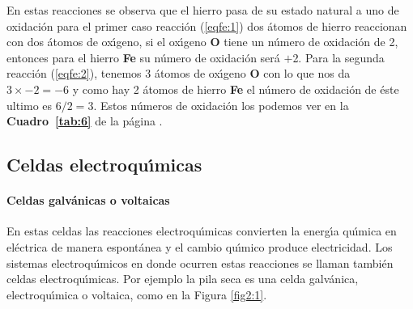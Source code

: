 En estas reacciones se observa que el hierro pasa de su estado natural a uno de oxidaci\'on para el primer caso reacci\'on (\ref{eqfe:1}) dos \'atomos de hierro reaccionan con dos \'atomos de ox\'{\i}geno, si el ox\'{\i}geno \textbf{O}  tiene un n\'umero de oxidaci\'on de 2, entonces para el hierro \textbf{Fe} su n\'umero de oxidaci\'on ser\'a $+$2. Para la segunda reacci\'on (\ref{eqfe:2}), tenemos 3 \'atomos de ox\'{\i}geno \textbf{O} con lo que nos da  $3\times-2=-6$ y como hay 2 \'atomos de hierro \textbf{Fe} el n\'umero de oxidaci\'on de  \'este ultimo es $6/2=3$. Estos n\'umeros de oxidaci\'on los podemos ver en la \textbf{Cuadro~\ref{tab:6}} de la p\'agina \pageref{tab:6}.


\subsection{Celdas electroqu\'{\i}micas}
\paragraph{Celdas galv\'anicas o voltaicas}
En estas celdas las reacciones electro\-qu\'{\i}\-mi\-cas convierten
la energ\'{\i}a  qu\'{\i}mica en el\'ectrica de manera espont\'anea y
el cambio qu\'{\i}mico produce electricidad. Los sistemas
electroqu\'{\i}micos en donde ocurren estas reacciones se llaman
tambi\'en celdas elec\-tro\-qu\'{\i}\-mi\-cas. Por ejemplo la pila seca  es
una celda galv\'anica, electroqu\'{\i}mica o voltaica, como en la Figura \ref{fig2:1}.

